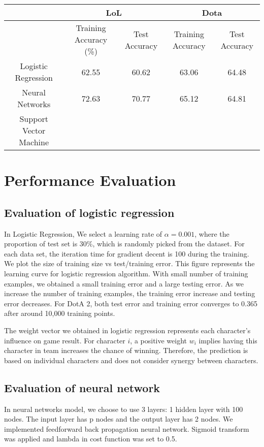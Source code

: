 \documentclass[conference]{IEEEtran}
\begin{document}
\begin{table}[h]
\begin{tabular}{c c c c c}
\hline
\toprule
                       & \multicolumn{2}{c}{LoL}    & \multicolumn{2}{c}{Dota}   \\
\midrule
                       & Training Accuracy (\%) & Test Accuracy & Training Accuracy & Test Accuracy \\ \hline
Logistic Regression    & 62.55         & 60.62     & 63.06         & 64.48     \\ \hline
Neural Networks        & 72.63        & 70.77     & 65.12        &64.81     \\ \hline
Support Vector Machine &                &            &                &            \\
\bottomrule
\end{tabular}
\end{table}
\section{Performance Evaluation}



\subsection{Evaluation of logistic regression}

In Logistic Regression, We select a learning rate of $\alpha = 0.001$, where the proportion of test set is 30\%, which is randomly picked from the dataset. For each data set, the iteration time for gradient decent is 100 during the training. We plot the size of training size vs test/training error.
This figure represents the learning curve for logistic regression algorithm. With small number of training examples, we obtained a small training error and a large testing error. As we increase the number of training examples, the training error increase and testing error decreases. For DotA 2, both test error and training error converges to 0.365 after around 10,000 training points.

The weight vector we obtained in logistic regression represents each character's influence on game result. For character $i$, a positive weight $w_i$ implies having this character in team increases the chance of winning. Therefore, the prediction is based on individual characters and does not consider synergy between characters.

\subsection{Evaluation of neural network}
In neural networks model, we choose to use 3 layers: 1 hidden layer with 100 nodes. The input layer has p nodes and the output layer has 2 nodes. We implemented feedforward back propagation neural network. Sigmoid transform was applied and lambda in cost function was set to 0.5. 
\end{document}
